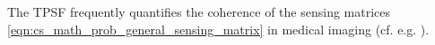 The \ac{TPSF} frequently quantifies
the coherence of
the sensing matrices
\eqref{eqn:cs_math_prob_general_sensing_matrix} in
medical imaging
(cf. e.g.
\cite{article:ProvostITMI2009,article:LustigMRM2007}%
).
